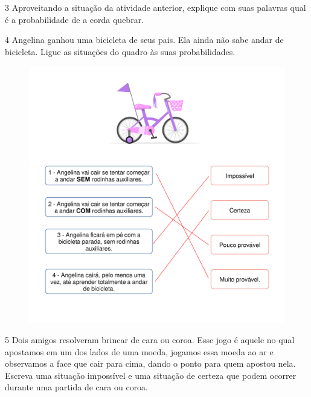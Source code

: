 \num{3} Aproveitando a situação da atividade anterior, explique com suas
palavras qual é a probabilidade de a corda quebrar.


\num{4} Angelina ganhou uma bicicleta de seus pais. Ela ainda não sabe andar de
bicicleta. Ligue as situações do quadro às suas probabilidades.


\begin{figure}[H]
\includegraphics[width=\textwidth]{./media/image87_prof.png}
\end{figure}


\num{5} Dois amigos resolveram brincar de cara ou coroa. Esse jogo é aquele no
qual apostamos em um dos lados de uma moeda, jogamos essa moeda ao ar e observamos a face
que cair para cima, dando o ponto para quem apostou nela. Escreva uma
situação impossível e uma situação de certeza que podem ocorrer durante uma partida de cara ou coroa.

